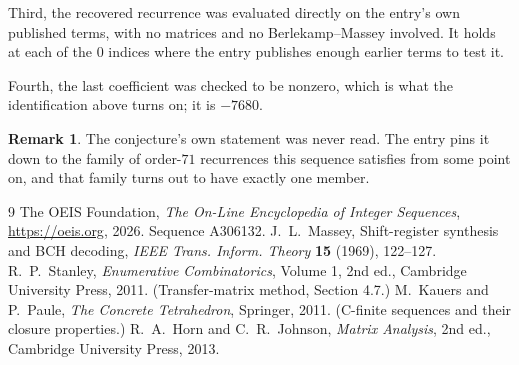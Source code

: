 \documentclass[11pt,a4paper]{article}
\theoremstyle{plain}
\theoremstyle{definition}
\newtheorem{remark}[theorem]{Remark}
\begin{document}
Third, the recovered recurrence was evaluated directly on the entry's own published terms, with
no matrices and no Berlekamp--Massey involved. It holds at each of the $0$ indices where
the entry publishes enough earlier terms to test it.

Fourth, the last coefficient was checked to be nonzero, which is what the identification above
turns on; it is $-7680$.

\begin{remark}
The conjecture's own statement was never read. The entry pins it down to the family of
order-$71$ recurrences this sequence satisfies from some point on, and that family turns
out to have exactly one member.
\end{remark}

\begin{thebibliography}{9}
 The OEIS Foundation, \emph{The On-Line Encyclopedia of Integer
Sequences}, \url{https://oeis.org}, 2026. Sequence A306132.
 J.~L.~Massey, Shift-register synthesis and BCH decoding, \emph{IEEE
Trans. Inform. Theory} \textbf{15} (1969), 122--127.
 R.~P.~Stanley, \emph{Enumerative Combinatorics}, Volume 1, 2nd ed.,
Cambridge University Press, 2011. (Transfer-matrix method, Section 4.7.)
 M.~Kauers and P.~Paule, \emph{The Concrete Tetrahedron}, Springer, 2011.
(C-finite sequences and their closure properties.)
 R.~A.~Horn and C.~R.~Johnson, \emph{Matrix Analysis}, 2nd ed., Cambridge
University Press, 2013.
\end{thebibliography}
\end{document}
